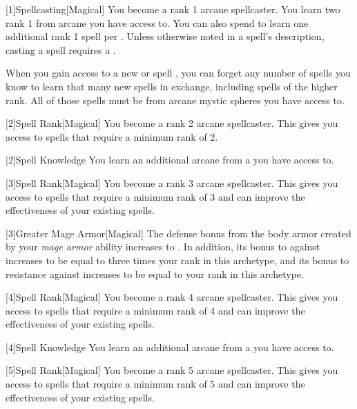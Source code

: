         [1]{Spellcasting}[Magical]
        You become a rank 1 arcane spellcaster.
        You learn two rank 1  from arcane  you have access to.
        You can also spend  to learn one additional rank 1 spell per .
        Unless otherwise noted in a spell's description, casting a spell requires a .

        When you gain access to a new  or spell ,
            you can forget any number of spells you know to learn that many new spells in exchange,
            including spells of the higher rank.
        All of those spells must be from arcane mystic spheres you have access to.

        [2]{Spell Rank}[Magical] You become a rank 2 arcane spellcaster.
        This gives you access to spells that require a minimum rank of 2.

        [2]{Spell Knowledge} You learn an additional arcane  from a  you have access to.

        [3]{Spell Rank}[Magical] You become a rank 3 arcane spellcaster.
        This gives you access to spells that require a minimum rank of 3 and can improve the effectiveness of your existing spells.

        [3]{Greater Mage Armor}[Magical]
        The defense bonus from the body armor created by your \textit{mage armor} ability increases to .
        In addition, its bonus to  against  increases to be equal to three times your rank in this archetype, and its bonus to resistance against  increases to be equal to your rank in this archetype.

        [4]{Spell Rank}[Magical] You become a rank 4 arcane spellcaster.
        This gives you access to spells that require a minimum rank of 4 and can improve the effectiveness of your existing spells.

        [4]{Spell Knowledge} You learn an additional arcane  from a  you have access to.

        [5]{Spell Rank}[Magical] You become a rank 5 arcane spellcaster.
        This gives you access to spells that require a minimum rank of 5 and can improve the effectiveness of your existing spells.

